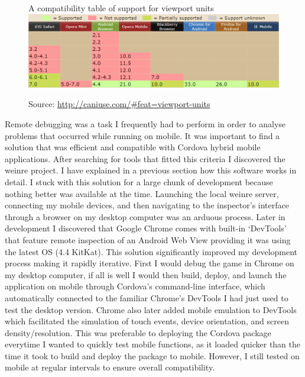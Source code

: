 \documentclass[final]{cmpreport}
\begin{document}
\begin{figure}[h]{A compatibility table of support for viewport units \label{viewport}}
  \includegraphics[width=1.0\textwidth]{viewportunits.png}
    \begin{tablenotes}
      \item Source: \url{http://caniuse.com/\#feat=viewport-units}
    \end{tablenotes}
\end{figure}

Remote debugging was a task I frequently had to perform in order to analyse problems that occurred while running on mobile. It was important to find a solution that was efficient and compatible with Cordova hybrid mobile applications. After searching for tools that fitted this criteria I discovered the weinre project. I have explained in a previous section how this software works in detail. I stuck with this solution for a large chunk of development because nothing better was available at the time. Launching the local weinre server, connecting my mobile devices, and then navigating to the inspector's interface through a browser on my desktop computer was an arduous process. Later in development I discovered that Google Chrome comes with built-in `DevTools' that feature remote inspection of an Android Web View providing it was using the latest OS (4.4 KitKat). This solution significantly improved my development process making it rapidly iterative. First I would debug the game in Chrome on my desktop computer, if all is well I would then build, deploy, and launch the application on mobile through Cordova's command-line interface, which automatically connected to the familiar Chrome's DevTools I had just used to test the desktop version. Chrome also later added mobile emulation to DevTools which facilitated the simulation of touch events, device orientation, and screen density/resolution. This was preferable to deploying the Cordova package everytime I wanted to quickly test mobile functions, as it loaded quicker than the time it took to build and deploy the package to mobile. However, I still tested on mobile at regular intervals to ensure overall compatibility.
\end{document}
